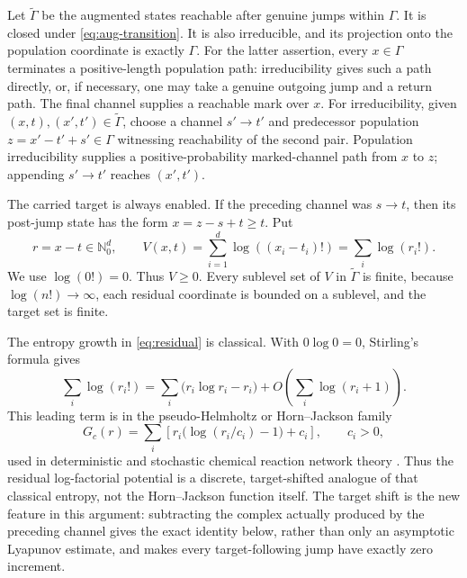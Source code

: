 Let \(\widetilde\Gamma\) be the augmented states reachable after genuine
jumps within \(\Gamma\).  It is closed under \eqref{eq:aug-transition}.  It is
also irreducible, and its projection onto the population coordinate is exactly
\(\Gamma\).  For the latter assertion, every \(x\in\Gamma\) terminates a
positive-length population path: irreducibility gives such a path directly,
or, if necessary, one may take a genuine outgoing jump and a return path.
The final channel supplies a reachable mark over \(x\).  For irreducibility,
given \((x,t),(x',t')\in\widetilde\Gamma\), choose
a channel \(s'\to t'\) and predecessor population
\(z=x'-t'+s'\in\Gamma\) witnessing reachability of the second pair.
Population irreducibility supplies a positive-probability marked-channel path
from \(x\) to \(z\); appending \(s'\to t'\) reaches \((x',t')\).

The carried target is always enabled.  If the preceding channel was
\(s\to t\), then its post-jump state has the form \(x=z-s+t\ge t\).  Put
\begin{equation}\label{eq:residual}
  r=x-t\in\mathbb N_0^d,
  \qquad
  V(x,t)=\sum_{i=1}^d\log((x_i-t_i)!)=\sum_i\log(r_i!).
\end{equation}
We use \(\log(0!)=0\).  Thus \(V\ge0\).  Every sublevel set of \(V\) in
\(\widetilde\Gamma\) is finite, because \(\log(n!)\to\infty\), each residual
coordinate is bounded on a sublevel, and the target set is finite.

The entropy growth in \eqref{eq:residual} is classical.  With
\(0\log0=0\), Stirling's formula gives
\begin{equation}\label{eq:stirling-entropy}
 \sum_i\log(r_i!)
 =\sum_i\bigl(r_i\log r_i-r_i\bigr)
  +O\!\left(\sum_i\log(r_i+1)\right).
\end{equation}
This leading term is in the pseudo-Helmholtz or Horn--Jackson family
\[
 G_c(r)=\sum_i\left[r_i\bigl(\log(r_i/c_i)-1\bigr)+c_i\right],
 \qquad c_i>0,
\]
used in deterministic and stochastic chemical reaction network theory
\citep{HornJackson1972,AndersonCraciunGopalkrishnanWiuf2015}.  Thus the residual log-factorial
potential is a discrete, target-shifted analogue of that classical entropy,
not the Horn--Jackson function itself.  The target shift is the new feature in
this argument: subtracting the complex actually produced by the preceding
channel gives the exact identity below, rather than only an asymptotic
Lyapunov estimate, and makes every target-following jump have exactly zero
increment.

